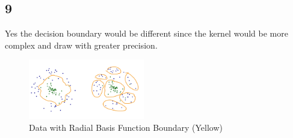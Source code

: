 \documentclass[a4paper]{article}
\begin{document}
\subsection*{9}
Yes the decision boundary would be different since the kernel would be more complex and draw with greater precision. 

\begin{figure}[h]
    \centering
    \includegraphics[width=0.45\textwidth]{IMG_A18C3AA43921-1.jpeg}
    \caption{Data with Radial Basis Function Boundary (Yellow)}
    \label{fig:my_label}
\end{figure}
\end{document}
